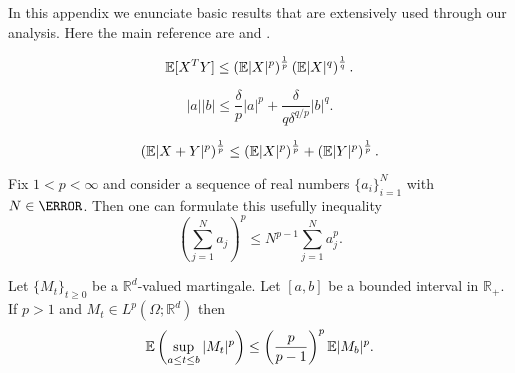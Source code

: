 In this appendix we enunciate basic results that are extensively used through our analysis. Here
the main reference are \cite{Shiryaev1996} and \cite{Mao2007}.
\begin{Holder}
	\begin{equation}\label{eqn:HolderInequality}
	\mathbb{E}[X^T Y] \leq
	\left(
	\mathbb{E}|X|^p
	\right)^{\frac{1}{p}}		
	\left(
	\mathbb{E}|X|^q
	\right)^{\frac{1}{q}}.
	\end{equation}
\end{Holder}

\begin{Young}
	\begin{equation}\label{eqn:YoungsInequality}
	|a||b| 
	\leq
	\frac{\delta}{p} |a|^p
	+\frac{\delta}{q \delta^{q/p}} |b|^q.
	\end{equation}
\end{Young}
%
\begin{Minkowski}
	\begin{equation}
	\left(
	\mathbb{E}|X+Y|^p
	\right)^{\frac{1}{p}}
	\leq
	\left(
	\mathbb{E}|X|^p
	\right)^{\frac{1}{p}}
	+
	\left(
	\mathbb{E}|Y|^p
	\right)^{\frac{1}{p}}.
	\end{equation}
\end{Minkowski}
%
%
\begin{Standard}
		Fix $1<p<\infty$ and consider a sequence of real numbers $\{a_i\}_{i=1}^{N}$  with $N \in \N$. Then one can 
	formulate this usefully inequality
	\begin{equation}\label{eqn:SingleHolder}
	\left(
	\sum_{j=1}^N a_j
	\right)^p
	\leq
	N^{p-1}
	\sum_{j=1}^{N}
	a_j^p.
	\end{equation}
\end{Standard}
%
\begin{Doobs}
	Let $\{M_t\}_{t\geq 0}$ be a $\mathbb{R}^d$-valued martingale. Let $[a,b]$ be a bounded interval in $
	\mathbb{R}_{+}$.
	If $p>1$ and $M_t\in L^p(\Omega;\mathbb{R}^d)$ then
	\begin{equation}
	\label{eqn:DoobMartingaleInequality}
	\mathbb{E}\left( \sup_{a\leq t \leq b} |M_t|^p\right) 
	\leq \left(\frac{p}{p-1}\right)^p \mathbb{E}|M_b|^p. 
	\end{equation}
\end{Doobs}

